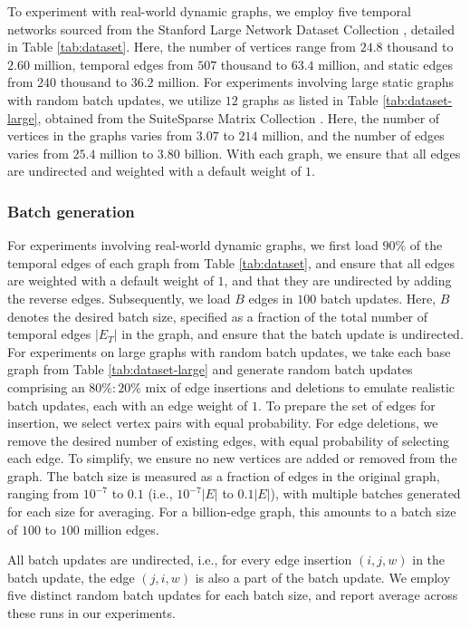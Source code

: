 To experiment with real-world dynamic graphs, we employ five temporal networks sourced from the Stanford Large Network Dataset Collection \cite{snapnets}, detailed in Table \ref{tab:dataset}. Here, the number of vertices range from $24.8$ thousand to $2.60$ million, temporal edges from $507$ thousand to $63.4$ million, and static edges from $240$ thousand to $36.2$ million. For experiments involving large static graphs with random batch updates, we utilize $12$ graphs as listed in Table \ref{tab:dataset-large}, obtained from the SuiteSparse Matrix Collection \cite{suite19}. Here, the number of vertices in the graphs varies from $3.07$ to $214$ million, and the number of edges varies from $25.4$ million to $3.80$ billion. With each graph, we ensure that all edges are undirected and weighted with a default weight of $1$.





\subsubsection{Batch generation}
\label{sec:batch-generation}

For experiments involving real-world dynamic graphs, we first load $90\%$ of the temporal edges of each graph from Table \ref{tab:dataset}, and ensure that all edges are weighted with a default weight of $1$, and that they are undirected by adding the reverse edges. Subsequently, we load $B$ edges in $100$ batch updates. Here, $B$ denotes the desired batch size, specified as a fraction of the total number of temporal edges $|E_T|$ in the graph, and ensure that the batch update is undirected. For experiments on large graphs with random batch updates, we take each base graph from Table \ref{tab:dataset-large} and generate random batch updates \cite{com-zarayeneh21} comprising an $80\% : 20\%$ mix of edge insertions and deletions to emulate realistic batch updates, each with an edge weight of $1$. To prepare the set of edges for insertion, we select vertex pairs with equal probability. For edge deletions, we remove the desired number of existing edges, with equal probability of selecting each edge. To simplify, we ensure no new vertices are added or removed from the graph. The batch size is measured as a fraction of edges in the original graph, ranging from $10^{-7}$ to $0.1$ (i.e., $10^{-7}|E|$ to $0.1|E|$), with multiple batches generated for each size for averaging. For a billion-edge graph, this amounts to a batch size of $100$ to $100$ million edges. All batch updates are undirected, i.e., for every edge insertion $(i, j, w)$ in the batch update, the edge $(j, i, w)$ is also a part of the batch update. We employ five distinct random batch updates for each batch size, and report average across these runs in our experiments.


